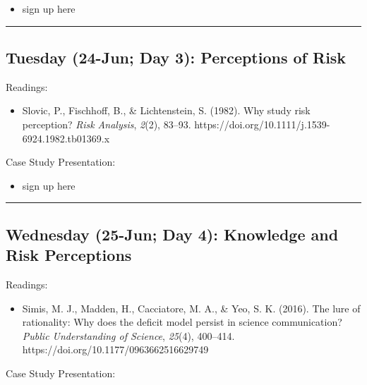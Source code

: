 \documentclass[
  letterpaper,
]{article}
\providecommand{\tightlist}{%
  \setlength{\itemsep}{0pt}\setlength{\parskip}{0pt}}\usepackage{longtable,booktabs,array}
\begin{document}
\begin{itemize}
\tightlist
\item
  sign up here
\end{itemize}

\begin{center}\rule{0.5\linewidth}{0.5pt}\end{center}

\hypertarget{tuesday-24-jun-day-3-perceptions-of-risk}{%
\subsection{Tuesday (24-Jun; Day 3): Perceptions of
Risk}\label{tuesday-24-jun-day-3-perceptions-of-risk}}

Readings:

\begin{itemize}
\tightlist
\item
  Slovic, P., Fischhoff, B., \& Lichtenstein, S. (1982). Why study risk
  perception? \emph{Risk Analysis}, \emph{2}(2), 83--93.
  https://doi.org/10.1111/j.1539-6924.1982.tb01369.x
\end{itemize}

Case Study Presentation:

\begin{itemize}
\tightlist
\item
  sign up here
\end{itemize}

\begin{center}\rule{0.5\linewidth}{0.5pt}\end{center}

\hypertarget{wednesday-25-jun-day-4-knowledge-and-risk-perceptions}{%
\subsection{Wednesday (25-Jun; Day 4): Knowledge and Risk
Perceptions}\label{wednesday-25-jun-day-4-knowledge-and-risk-perceptions}}

Readings:

\begin{itemize}
\tightlist
\item
  Simis, M. J., Madden, H., Cacciatore, M. A., \& Yeo, S. K. (2016). The
  lure of rationality: Why does the deficit model persist in science
  communication? \emph{Public Understanding of Science}, \emph{25}(4),
  400--414. https://doi.org/10.1177/0963662516629749
\end{itemize}

Case Study Presentation:
\end{document}
